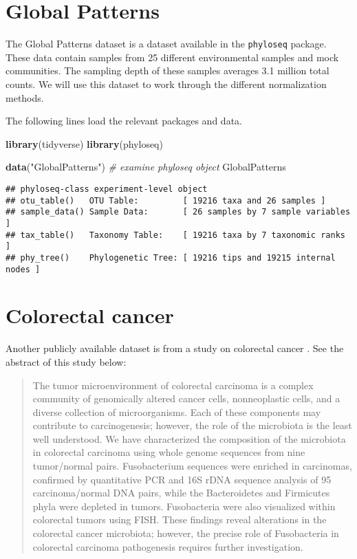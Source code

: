 \documentclass[
]{book}
\newenvironment{Shaded}{\begin{snugshade}}{\end{snugshade}}
\newcommand{\CommentTok}[1]{\textcolor[rgb]{0.56,0.35,0.01}{\textit{#1}}}
\newcommand{\KeywordTok}[1]{\textcolor[rgb]{0.13,0.29,0.53}{\textbf{#1}}}
\newcommand{\NormalTok}[1]{#1}
\newcommand{\StringTok}[1]{\textcolor[rgb]{0.31,0.60,0.02}{#1}}
\begin{document}
\hypertarget{global-patterns}{%
\section{Global Patterns}\label{global-patterns}}

The Global Patterns dataset \citep{caporaso2011} is a dataset available in the \texttt{phyloseq} package. These data contain samples from 25 different environmental samples and mock communities. The sampling depth of these samples averages 3.1 million total counts. We will use this dataset to work through the different normalization methods.

The following lines load the relevant packages and data.

\begin{Shaded}
\begin{Highlighting}[]
\KeywordTok{library}\NormalTok{(tidyverse)}
\KeywordTok{library}\NormalTok{(phyloseq)}

\KeywordTok{data}\NormalTok{(}\StringTok{"GlobalPatterns"}\NormalTok{)}
\CommentTok{\# examine phyloseq object }
\NormalTok{GlobalPatterns}
\end{Highlighting}
\end{Shaded}

\begin{verbatim}
## phyloseq-class experiment-level object
## otu_table()   OTU Table:         [ 19216 taxa and 26 samples ]
## sample_data() Sample Data:       [ 26 samples by 7 sample variables ]
## tax_table()   Taxonomy Table:    [ 19216 taxa by 7 taxonomic ranks ]
## phy_tree()    Phylogenetic Tree: [ 19216 tips and 19215 internal nodes ]
\end{verbatim}

\hypertarget{colorectal-cancer}{%
\section{Colorectal cancer}\label{colorectal-cancer}}

Another publicly available dataset is from a study on colorectal cancer \citep{kostic2012}. See the abstract of this study below:

\begin{quote}
The tumor microenvironment of colorectal carcinoma is a complex community of genomically altered cancer cells, nonneoplastic cells, and a diverse collection of microorganisms. Each of these components may contribute to carcinogenesis; however, the role of the microbiota is the least well understood. We have characterized the composition of the microbiota in colorectal carcinoma using whole genome sequences from nine tumor/normal pairs. Fusobacterium sequences were enriched in carcinomas, confirmed by quantitative PCR and 16S rDNA sequence analysis of 95 carcinoma/normal DNA pairs, while the Bacteroidetes and Firmicutes phyla were depleted in tumors. Fusobacteria were also visualized within colorectal tumors using FISH. These findings reveal alterations in the colorectal cancer microbiota; however, the precise role of Fusobacteria in colorectal carcinoma pathogenesis requires further investigation.
\end{quote}
\end{document}
